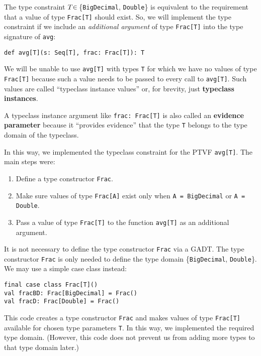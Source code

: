 The type constraint $T\negthickspace\in\,$\{\lstinline!BigDecimal!,
\lstinline!Double!\} is equivalent to the requirement that a value
of type \lstinline!Frac[T]! should exist. So, we will implement the
type constraint if we include an \emph{additional argument} of type
\lstinline!Frac[T]! into the type signature of \lstinline!avg!:
\begin{lstlisting}
def avg[T](s: Seq[T], frac: Frac[T]): T
\end{lstlisting}
We will be unable to use \lstinline!avg[T]! with types \lstinline!T!
for which we have no values of type \lstinline!Frac[T]! because such
a value needs to be passed to every call to \lstinline!avg[T]!. Such
values are called \textsf{``}typeclass instance values\textsf{''} or, for brevity,
just \textbf{typeclass instances}.

A typeclass instance argument like \lstinline!frac: Frac[T]! is also
called an \textbf{evidence parameter} 
because it \textsf{``}provides evidence\textsf{''} that the type \lstinline!T! belongs
to the type domain of the typeclass. 

In this way, we implemented the typeclass constraint for the PTVF
\lstinline!avg[T]!. The main steps were:
\begin{enumerate}
\item Define a type constructor \lstinline!Frac!.
\item Make sure values of type \lstinline!Frac[A]! exist only when \lstinline!A = BigDecimal!
or \lstinline!A = Double!.
\item Pass a value of type \lstinline!Frac[T]! to the function \lstinline!avg[T]!
as an additional argument.
\end{enumerate}
It is not necessary to define the type constructor \lstinline!Frac!
via a GADT. The type constructor \lstinline!Frac! is only needed
to define the type domain \{\lstinline!BigDecimal!, \lstinline!Double!\}.
We may use a simple case class instead:
\begin{lstlisting}
final case class Frac[T]()
val fracBD: Frac[BigDecimal] = Frac()
val fracD: Frac[Double] = Frac()
\end{lstlisting}

\noindent This code creates a type constructor \lstinline!Frac! and
makes values of type \lstinline!Frac[T]! available for chosen type
parameters \lstinline!T!. In this way, we implemented the required
type domain. (However, this code does not prevent us from adding more
types to that type domain later.)

